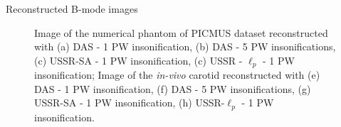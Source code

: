 {\begin{block}{Reconstructed B-mode images}
\begin{figure}[htb]
	\hfill%
	\hfill\null%
	\caption{Image of the numerical phantom of PICMUS dataset reconstructed with (a) DAS - 1 PW insonification, (b) DAS - 5 PW insonifications, (c) USSR-SA - 1 PW insonification, (c) USSR - $\ell_p$ - 1 PW insonification; Image of the \textit{in-vivo} carotid reconstructed with (e) DAS - 1 PW insonification, (f) DAS - 5 PW insonifications, (g) USSR-SA - 1 PW insonification, (h) USSR-$\ell_p$ - 1 PW insonification.}
	\label{fig_Bmode}
\end{figure}
	

\end{block}}
